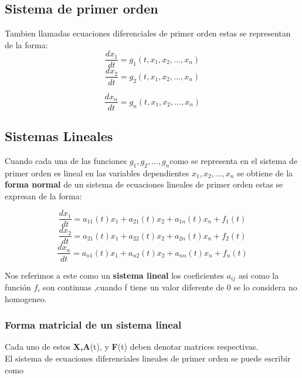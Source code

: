 \documentclass[11.5pt]{article}
\begin{document}
\subsection*{Sistema de primer orden }
Tambien llamadas ecuaciones diferenciales de primer orden estas se representan de la forma:\\
\textbf{$$ \frac{dx_1}{dt} = g_1(t,x_1,x_2,...,x_n)$$}
\textbf{$$ \frac{dx_2}{dt} = g_2(t,x_1,x_2,...,x_n)$$}

\textbf{$$ \frac{dx_n}{dt} = g_n(t,x_1,x_2,...,x_n)$$}
\subsection{Sistemas Lineales}
Cuando cada una de las funciones $ g_1, g_2,..., g_n $como se representa en el sistema de primer orden es lineal en las variables dependientes $ x_1,x_2,...,x_n$ se obtiene de la \textbf{forma normal} de un sistema de ecuaciones lineales de primer orden estas se expresan de la forma:

\textbf{$$\frac{dx_1}{dt}=a_{11}(t)x_1 + a_{21}(t)x_2 + a_{1n}(t)x_n + f_1(t)$$}
\textbf{$$\frac{dx_2}{dt}=a_{21}(t)x_1 + a_{22}(t)x_2 + a_{2n}(t)x_n + f_2(t)$$}
\textbf{$$\frac{dx_n}{dt}=a_{n1}(t)x_1 + a_{n2}(t)x_2 + a_{nn}(t)x_n + f_n(t)$$}

Nos referimos a este como un \textbf{sistema lineal} los coeficientes $a_{ij}$ asi como  la función $f_i$ son continuas ,cuando f tiene un valor diferente de $ 0$ se lo considera no homogeneo.

\subsubsection{Forma matricial de un sistema lineal}
Cada uno de estos \textbf{X,A}(t), y \textbf{F}(t) deben denotar matrices respectivas.\\
El sistema de ecuaciones diferenciales lineales de primer orden  se puede escribir como\\
\end{document}
